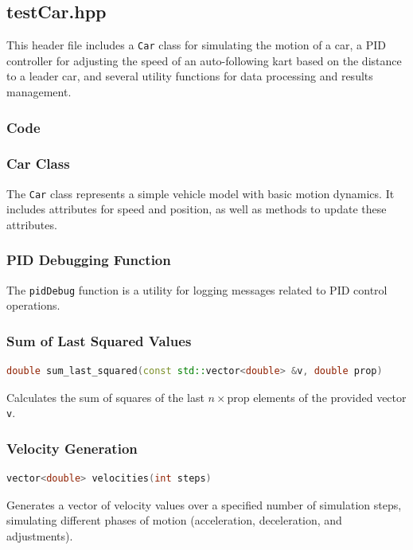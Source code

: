 \documentclass[a4paper,12pt]{article}
\begin{document}
\subsection{testCar.hpp}
This header file includes a \texttt{Car} class for simulating the motion of a car, a PID controller for adjusting the speed of an auto-following kart based on the distance to a leader car, and several utility functions for data processing and results management.
\subsubsection{Code}

\subsubsection{Car Class}
The \texttt{Car} class represents a simple vehicle model with basic motion dynamics. It includes attributes for speed and position, as well as methods to update these attributes.
\subsubsection{PID Debugging Function}
The \texttt{pidDebug} function is a utility for logging messages related to PID control operations.
\subsubsection{Sum of Last Squared Values}
\begin{lstlisting}[language=C++]
double sum_last_squared(const std::vector<double> &v, double prop)
\end{lstlisting}
Calculates the sum of squares of the last $n \times \text{prop}$ elements of the provided vector \texttt{v}.
\subsubsection{Velocity Generation}
\begin{lstlisting}[language=C++]
vector<double> velocities(int steps)
\end{lstlisting}
Generates a vector of velocity values over a specified number of simulation steps, simulating different phases of motion (acceleration, deceleration, and adjustments).
\end{document}
